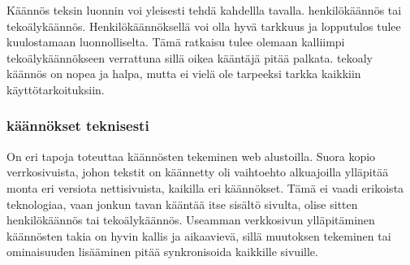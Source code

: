 \documentclass[11pt,a4paper,titlepage,oneside]{article}
\begin{document}





Käännös teksin luonnin voi yleisesti tehdä kahdellla tavalla. henkilökäännös tai tekoälykäännös.
Henkilökäännöksellä voi olla hyvä tarkkuus ja lopputulos tulee kuulostamaan luonnolliselta.
Tämä ratkaisu tulee olemaan kalliimpi tekoälykäännökseen verrattuna sillä oikea kääntäjä pitää palkata.
tekoaly käännös on nopea ja halpa, mutta ei vielä ole tarpeeksi tarkka kaikkiin käyttötarkoituksiin.\citemissing
\medskip









\subsubsection{käännökset teknisesti}




On eri tapoja toteuttaa käännösten tekeminen web alustoilla. 
Suora kopio verrkosivuista, johon tekstit on käännetty oli vaihtoehto alkuajoilla
ylläpitää monta eri versiota nettisivuista, kaikilla eri käännökset.
Tämä ei vaadi erikoista teknologiaa, vaan jonkun tavan kääntää itse sisältö sivulta,
olise sitten henkilökäännös tai tekoälykäännös.
Useamman verkkosivun ylläpitäminen käännösten takia on hyvin kallis ja aikaavievä, 
sillä muutoksen tekeminen tai ominaisuuden lisääminen pitää synkronisoida kaikkille sivuille.\citemissing
\medskip
\end{document}
